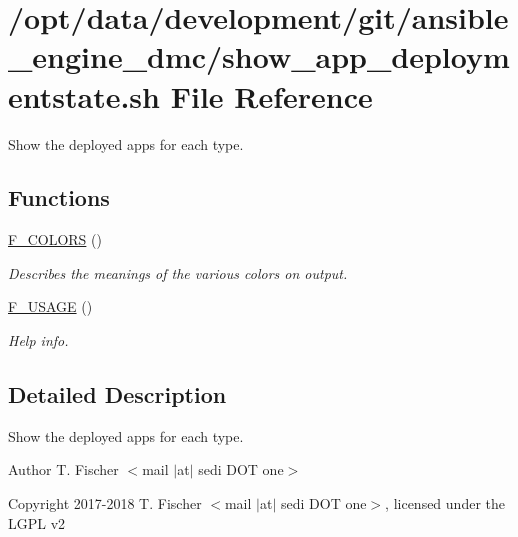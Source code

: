\hypertarget{show__app__deploymentstate_8sh}{}\section{/opt/data/development/git/ansible\+\_\+engine\+\_\+dmc/show\+\_\+app\+\_\+deploymentstate.sh File Reference}
\label{show__app__deploymentstate_8sh}


Show the deployed apps for each type.  


\subsection*{Functions}
\begin{DoxyCompactItemize}
\item 
\mbox{\label{show__app__deploymentstate_8sh_aa39d993d255cc55d41d7704bb86bb962}} 
\mbox{\hyperlink{show__app__deploymentstate_8sh_aa39d993d255cc55d41d7704bb86bb962}{F\+\_\+\+C\+O\+L\+O\+RS}} ()
\begin{DoxyCompactList}\small\item\em Describes the meanings of the various colors on output. \end{DoxyCompactList}\item 
\mbox{\label{show__app__deploymentstate_8sh_abbb71bad0f7277cfb53b278ad3ca550d}} 
\mbox{\hyperlink{show__app__deploymentstate_8sh_abbb71bad0f7277cfb53b278ad3ca550d}{F\+\_\+\+U\+S\+A\+GE}} ()
\begin{DoxyCompactList}\small\item\em Help info. \end{DoxyCompactList}\end{DoxyCompactItemize}


\subsection{Detailed Description}
Show the deployed apps for each type. 

\begin{DoxyAuthor}{Author}
T. Fischer $<$mail $\vert$at$\vert$ sedi D\+OT one$>$ 
\end{DoxyAuthor}
\begin{DoxyCopyright}{Copyright}
2017-\/2018 T. Fischer $<$mail $\vert$at$\vert$ sedi D\+OT one$>$, licensed under the L\+G\+PL v2 
\end{DoxyCopyright}
